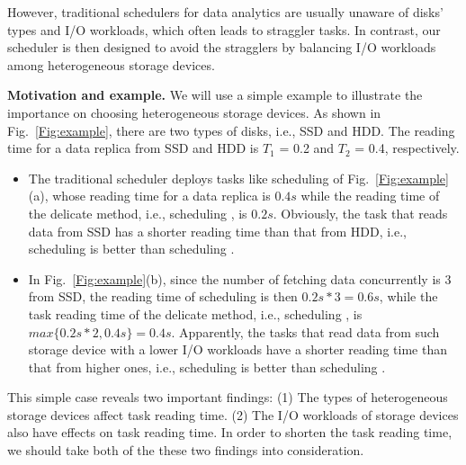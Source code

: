 \documentclass[conference]{IEEEtran}
\begin{document}
However, traditional schedulers for data analytics are usually unaware of disks' types and I/O workloads, which often leads to straggler tasks. In contrast, our scheduler is then designed to avoid the stragglers by balancing I/O workloads among heterogeneous storage devices.

\textbf{Motivation and example.}
We will use a simple example to illustrate the importance on choosing heterogeneous storage devices. As shown in Fig.~\ref{Fig:example}, there are two types of disks, i.e., SSD and HDD. The reading time for a data replica from SSD and HDD is $T_1$ = 0.2 and $T_2$ = 0.4, respectively. 
\begin{itemize}
	\item The traditional scheduler deploys tasks like scheduling \uppercase\expandafter{} of Fig.~\ref{Fig:example}(a), whose reading time for a data replica is $0.4s$ while the reading time of the delicate method, i.e., scheduling \uppercase\expandafter{}, is $0.2s$. Obviously, the task that reads data from SSD has a shorter reading time than that from HDD, i.e., scheduling \uppercase\expandafter{} is better than scheduling \uppercase\expandafter{}.

	\item In Fig.~\ref{Fig:example}(b), since the number of fetching data concurrently is 3 from SSD, the reading time of scheduling \uppercase\expandafter{} is then $0.2s * 3 = 0.6s$, while the task reading time of the delicate method, i.e., scheduling \uppercase\expandafter{}, is $max\{0.2s * 2, 0.4s\} = 0.4s$. Apparently, the tasks that read data from such storage device with a lower I/O workloads have a shorter reading time than that from higher ones, i.e., scheduling \uppercase\expandafter{} is better than scheduling \uppercase\expandafter{}.
\end{itemize}

This simple case reveals two important findings: (1) The types of heterogeneous storage devices affect task reading time. (2) The I/O workloads of storage devices also have effects on task reading time. In order to shorten the task reading time, we should take both of the these two findings into consideration.

\end{document}
